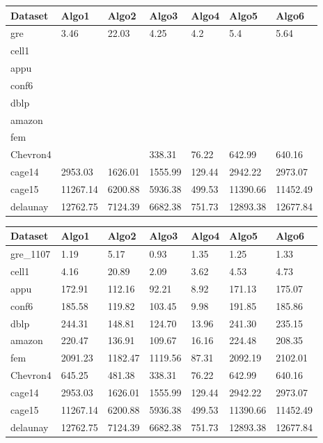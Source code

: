 \begin{center} %
    \begin{tabular}{| l | l | l | l | l | l | l |}
    \hline
	Dataset & Algo1 & Algo2 & Algo3 & Algo4 & Algo5 & Algo6\\ \hline
	gre & 3.46 & 22.03 & 4.25 & 4.2 & 5.4 & 5.64 \\ \hline
	cell1 &  &  &  &  &  & \\ \hline
	appu &  &  &  &  &  & \\ \hline
	conf6 &  &  &  &  &  & \\ \hline
	dblp &  &  &  &  &  & \\ \hline
	amazon &  &  &  &  &  & \\ \hline
	fem &  &  &  &  &  & \\ \hline
	Chevron4 &  &  & 338.31 & 76.22 & 642.99 & 640.16\\ \hline
	cage14 & 2953.03 & 1626.01 & 1555.99 & 129.44 & 2942.22 & 2973.07\\ \hline
	cage15 & 11267.14 & 6200.88 & 5936.38 & 499.53 & 11390.66 & 11452.49\\ \hline
	delaunay & 12762.75 & 7124.39 & 6682.38 & 751.73 & 12893.38 & 12677.84\\ \hline
    \hline
    \end{tabular}
\end{center}


\begin{center} %
    \begin{tabular}{| l | l | l | l | l | l | l |}
    \hline
	Dataset & Algo1 & Algo2 & Algo3 & Algo4 & Algo5 & Algo6\\ \hline
	gre\_1107 & 1.19 & 5.17 & 0.93 & 1.35 & 1.25 & 1.33 \\ \hline
	cell1 & 4.16 & 20.89 & 2.09 & 3.62 & 4.53 & 4.73\\ \hline
	appu & 172.91 & 112.16 & 92.21 & 8.92 & 171.13 & 175.07\\ \hline
	conf6 & 185.58 & 119.82 & 103.45 & 9.98 & 191.85 & 185.86\\ \hline
	dblp & 244.31 & 148.81 & 124.70 & 13.96 & 241.30 & 235.15\\ \hline
	amazon & 220.47 & 136.91 & 109.67 & 16.16 & 224.48 & 208.35\\ \hline
	fem & 2091.23 & 1182.47 & 1119.56 & 87.31 & 2092.19 & 2102.01\\ \hline
	Chevron4 & 645.25 & 481.38 & 338.31 & 76.22 & 642.99 & 640.16\\ \hline
	cage14 & 2953.03 & 1626.01 & 1555.99 & 129.44 & 2942.22 & 2973.07\\ \hline
	cage15 & 11267.14 & 6200.88 & 5936.38 & 499.53 & 11390.66 & 11452.49\\ \hline
	delaunay & 12762.75 & 7124.39 & 6682.38 & 751.73 & 12893.38 & 12677.84\\ \hline
    \hline
    \end{tabular}
\end{center}


